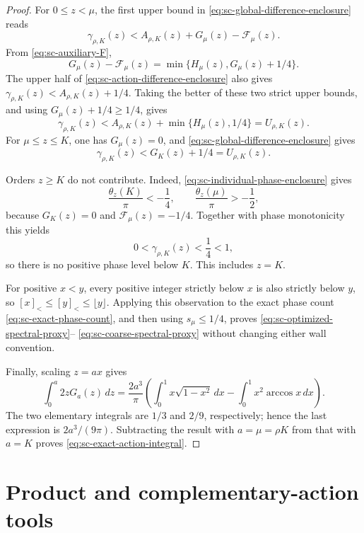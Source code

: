 \documentclass[11pt]{article}
\numberwithin{equation}{section}
\theoremstyle{definition}
\theoremstyle{remark}
\begin{document}
\begin{proof}
For \(0\le z<\mu\), the first upper bound in
\eqref{eq:sc-global-difference-enclosure} reads
\[
  \gamma_{\rho,K}(z)
  <A_{\rho,K}(z)+G_\mu(z)-\mathcal F_\mu(z).
\]
From \eqref{eq:sc-auxiliary-F},
\[
  G_\mu(z)-\mathcal F_\mu(z)
  =\min\{H_\mu(z),G_\mu(z)+1/4\}.
\]
The upper half of \eqref{eq:sc-action-difference-enclosure} also gives
\(\gamma_{\rho,K}(z)<A_{\rho,K}(z)+1/4\).  Taking the better of these two
strict upper bounds, and using \(G_\mu(z)+1/4\ge1/4\), gives
\[
  \gamma_{\rho,K}(z)
  <A_{\rho,K}(z)+\min\{H_\mu(z),1/4\}
  =U_{\rho,K}(z).
\]
For \(\mu\le z\le K\), one has \(G_\mu(z)=0\), and
\eqref{eq:sc-global-difference-enclosure} gives
\[
  \gamma_{\rho,K}(z)<G_K(z)+1/4=U_{\rho,K}(z).
\]

Orders \(z\ge K\) do not contribute.  Indeed,
\eqref{eq:sc-individual-phase-enclosure} gives
\[
  \frac{\theta_z(K)}\pi<-\frac14,
  \qquad
  \frac{\theta_z(\mu)}\pi>-\frac12,
\]
because \(G_K(z)=0\) and \(\mathcal F_\mu(z)=-1/4\).  Together with phase
monotonicity this yields
\[
  0<\gamma_{\rho,K}(z)<\frac14<1,
\]
so there is no positive phase level below \(K\).  This includes \(z=K\).

For positive \(x<y\), every positive integer strictly below \(x\) is also
strictly below \(y\), so \([x]_<\le[y]_<\le\lfloor y\rfloor\).  Applying
this observation to the exact phase count
\eqref{eq:sc-exact-phase-count}, and then using
\(s_\mu\le1/4\), proves
\eqref{eq:sc-optimized-spectral-proxy}--
\eqref{eq:sc-coarse-spectral-proxy} without changing either wall
convention.

Finally, scaling \(z=ax\) gives
\[
  \int_0^a2zG_a(z)\,dz
  =\frac{2a^3}{\pi}
  \left(\int_0^1x\sqrt{1-x^2}\,dx
  -\int_0^1x^2\arccos x\,dx\right).
\]
The two elementary integrals are \(1/3\) and \(2/9\), respectively; hence
the last expression is \(2a^3/(9\pi)\).  Subtracting the result with
\(a=\mu=\rho K\) from that with \(a=K\) proves
\eqref{eq:sc-exact-action-integral}.
\end{proof}

\section{Product and complementary-action tools}
\label{sec:product-action-tools}
\end{document}
